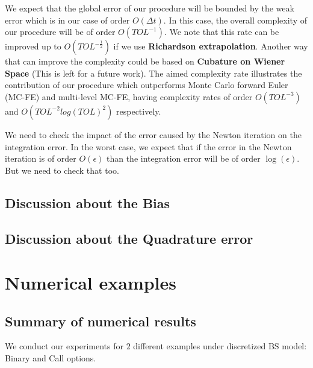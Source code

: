 \documentclass[11pt]{article}
\begin{document}
\begin{remark}
	We expect that the global error of our procedure will be bounded by the weak error which is in our case of order $O(\Delta t)$. In this case, the overall complexity of our procedure will be of order $O(TOL^{-1})$. We note that this rate can be improved up to $O(TOL^{-\frac{1}{2}})$ if we use \textbf{Richardson extrapolation}. Another way that can improve the complexity could be based on \textbf{Cubature on Wiener Space} (This is left for a future work). The aimed complexity rate illustrates the contribution of our procedure which outperforms  Monte Carlo forward Euler (MC-FE) and multi-level MC-FE, having complexity rates of order $O(TOL^{-3})$  and $O(TOL^{-2} log(TOL)^2)$  respectively. 
\end{remark}


\begin{remark}
	\item We need to check the impact of the error caused by the Newton iteration on the integration error. In the worst case, we expect that if the error in the Newton iteration is of order $O(\epsilon)$ than the integration error will be of order $\operatorname{log}(\epsilon)$. But we need to check that too.
	\end{remark}



\subsection{Discussion about the Bias}

\subsection{Discussion about the Quadrature error}
\newpage
\section{Numerical examples}
\subsection{Summary of numerical results}
We conduct our experiments for $2$ different examples under discretized BS model: Binary and Call options.
\end{document}
